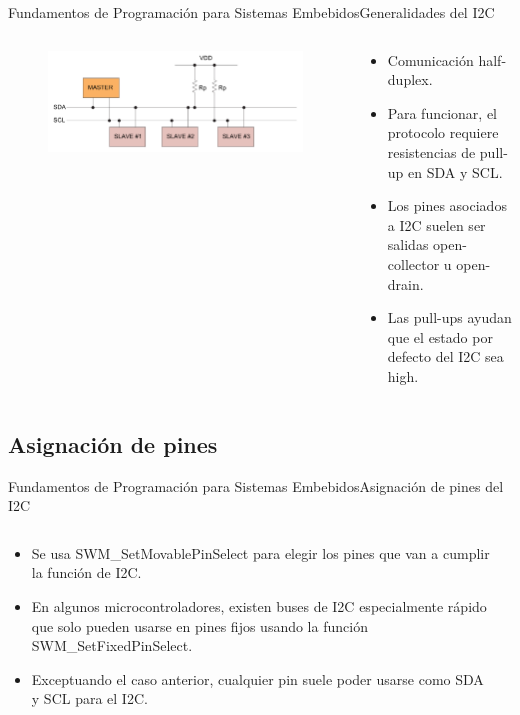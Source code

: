 \documentclass[aspectratio=169, xcolor=dvipsnames]{beamer}
\begin{document}
\begin{frame}{Fundamentos de Programación para Sistemas Embebidos}{Generalidades del I2C}
\begin{columns}
\begin{column}{0.5\textwidth}
\begin{figure}
    \centering
    \includegraphics[width=1\linewidth]{resources/images/i2c_pullups.png}
\end{figure}
\end{column}
\begin{column}{0.5\textwidth}
\begin{itemize}
    \item Comunicación half-duplex.
    \item Para funcionar, el protocolo requiere resistencias de pull-up en SDA y SCL.
    \item Los pines asociados a I2C suelen ser salidas open-collector u open-drain.
    \item Las pull-ups ayudan que el estado por defecto del I2C sea high.
\end{itemize}
\end{column}
\end{columns}
\end{frame}

\subsection{Asignación de pines}
\begin{frame}{Fundamentos de Programación para Sistemas Embebidos}{Asignación de pines del I2C}
\begin{columns}
\begin{column}{0.5\textwidth}
\begin{itemize}
    \item Se usa \textcolor{myblue}{SWM\_SetMovablePinSelect} para elegir los pines que van a cumplir la función de I2C.
    \item En algunos microcontroladores, existen buses de I2C especialmente rápido que solo pueden usarse en pines fijos usando la función \textcolor{myblue}{SWM\_SetFixedPinSelect}.
    \item Exceptuando el caso anterior, cualquier pin suele poder usarse como SDA y SCL para el I2C.
\end{itemize}
\end{column}
\begin{column}{0.5\textwidth}

\end{column}
\end{columns}
\end{frame}
\end{document}
